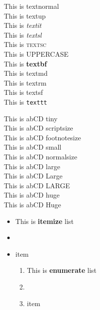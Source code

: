 \documentclass[12pt, a4paper]{report}
\begin{document}
This is \textnormal{textnormal}\\ This is \textup{textup}\\
This is \textit{textit}\\ This is \textsl{textsl}\\
This is \textsc{textsc}\\ This is \uppercase{uppercase}\\
This is \textbf{textbf}\\ This is \textmd{textmd}\\
This is \textrm{textrm}\\
This is \textsf{textsf}\\ This is \texttt{texttt}\\


\vfill

{This is \tiny abCD tiny}\\
{This is \scriptsize abCD scriptsize}\\
{This is \footnotesize abCD footnotesize}\\
{This is \small abCD small}\\
{This is \normalsize abCD normalsize}\\
{This is \large abCD large}\\
{This is \Large abCD Large}\\
{This is \LARGE abCD LARGE}\\
{This is \huge abCD huge}\\
{This is \Huge abCD Huge}\\


\newpage

\begin{itemize}
    \item This is \textbf{itemize} list
    \item \lipsum[1]
    \item item


    \begin{enumerate}
        \item This is \textbf{enumerate} list
        \item \lipsum[2]
        \item item
    \end{enumerate}

\end{itemize}
\end{document}
